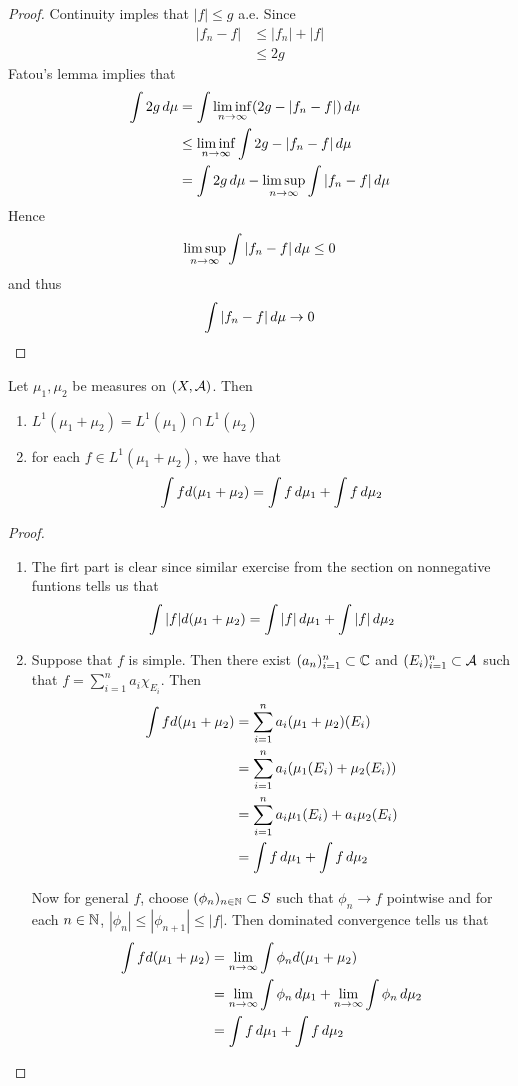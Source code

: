 \documentclass{book}
\begin{document}
	\begin{proof}
	Continuity imples that $|f| \leq g$ a.e. Since 
	\begin{align*}
	|f_n - f| 
	&\leq |f_n| + |f| \\
	&\leq 2g
	\end{align*}	 
	Fatou's lemma implies that 
	\begin{align*}
	\int 2g \, d \mu 
	&= \int \liminf \limits_{n \rightarrow \infty} (2g - |f_n - f|) \, d \mu \\
	&\leq \liminf \limits_{n \rightarrow \infty} \int 2g - |f_n - f| \, d \mu  \\
	&= \int 2g \, d \mu - \limsup \limits_{n \rightarrow \infty} \int |f_n -f| \, d \mu \\
	\end{align*}
	Hence $$ \limsup \limits_{n \rightarrow \infty} \int |f_n -f| \, d \mu \leq 0 $$ and thus $$\int |f_n -f| \, d \mu \rightarrow 0$$
	\end{proof}
	
	\begin{ex}  
		Let $\mu_1, \mu_2$ be measures on $(X, \mathcal{A})$. Then
		\begin{enumerate}
			\item $L^1(\mu_1 + \mu_2) = L^1(\mu_1) \cap L^1(\mu_2)$
			
			\item for each $f \in L^1(\mu_1 + \mu_2)$, we have that $$\int f d(\mu_1 + \mu_2) = \int f \, d \mu_1 + \int f \, d \mu_2$$
		\end{enumerate}
	\end{ex}
	
	\begin{proof}
		\begin{enumerate}
			\item The firt part is clear since similar exercise from the section on nonnegative funtions tells us that $$\int |f| d(\mu_1 + \mu_2) = \int |f| \, d \mu_1 + \int |f| \, d \mu_2$$
			
			
			\item Suppose that $f$ is simple. Then there exist $(a_n)_{i=1}^n \subset \mathbb{C}$ and $(E_i)_{i=1}^n \subset \mathcal{A}$ such that $f = \sum\limits_{i =1}^n a_i \chi_{E_i}$. Then 
			\begin{align*}
				\int f d(\mu_1 + \mu_2) 
				&= \sum\limits_{i =1}^n a_i (\mu_1 + \mu_2)(E_i)\\
				&= \sum\limits_{i =1}^n a_i (\mu_1(E_i) + \mu_2(E_i))\\
				&= \sum\limits_{i =1}^n a_i \mu_1(E_i) + a_i \mu_2(E_i)\\
				&= \int f \, d \mu_1 + \int f \, d \mu_2
			\end{align*}
			
			Now for general $f$, choose $(\phi_n)_{n \in \mathbb{N}} \subset S$ such that $\phi_n \rightarrow f$ pointwise and for each $n \in \mathbb{N}$, $|\phi_n| \leq |\phi_{n+1}| \leq |f|$. Then dominated convergence tells us that 
			\begin{align*}
				\int f d(\mu_1 + \mu_2) 
				&= \lim \limits_{n \rightarrow \infty} \int \phi_n d(\mu_1 + \mu_2)\\
				&= \lim \limits_{n \rightarrow \infty} \int \phi_n \, d \mu_1 + \lim \limits_{n \rightarrow \infty} \int \phi_n \, d \mu_2 \\
				&= \int f \, d \mu_1 + \int f \, d \mu_2
			\end{align*}
		\end{enumerate}
	\end{proof}
	
\end{document}
